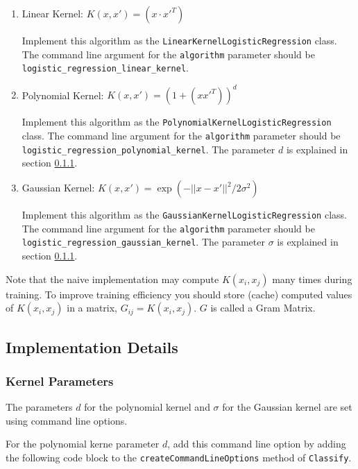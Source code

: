 \documentclass[11pt]{article}
\newcommand{\code}[1]{{\footnotesize \tt #1}}
\begin{document}
\begin{enumerate}
\item Linear Kernel: $K(x, x') = (x \cdot x'^T)$

Implement this algorithm as the \code{LinearKernelLogisticRegression} class. The command line argument for the \code{algorithm} parameter should be \code{logistic\_regression\_linear\_kernel}.

\item Polynomial Kernel: $K(x, x') = (1 + (x x'^T))^d$

Implement this algorithm as the \code{PolynomialKernelLogisticRegression} class. The command line argument for the \code{algorithm} parameter should be \code{logistic\_regression\_polynomial\_kernel}. The parameter $d$ is explained in section \ref{sec:kernel_parameters}.

\item Gaussian Kernel: $K(x, x') = \exp(-|| x-x'||^2 / 2 \sigma^2)$

Implement this algorithm as the \code{GaussianKernelLogisticRegression} class. The command line argument for the \code{algorithm} parameter should be \code{logistic\_regression\_gaussian\_kernel}. The parameter $\sigma$ is explained in section \ref{sec:kernel_parameters}.

\end{enumerate}

Note that the naive implementation may compute $K(x_i,x_j)$ many times during training. To improve training efficiency you should store (cache) computed values of $K(x_i,x_j)$ in a matrix, $G_{ij}=K(x_i, x_j)$. $G$ is called a Gram Matrix.




\subsection{Implementation Details}

\subsubsection{Kernel Parameters}
\label{sec:kernel_parameters}

The parameters $d$ for the polynomial kernel and $\sigma$ for the Gaussian kernel are set using command line options.

For the polynomial kerne parameter $d$, add this command line option by adding the following code block to the \code{createCommandLineOptions} method of \code{Classify}.
\end{document}

